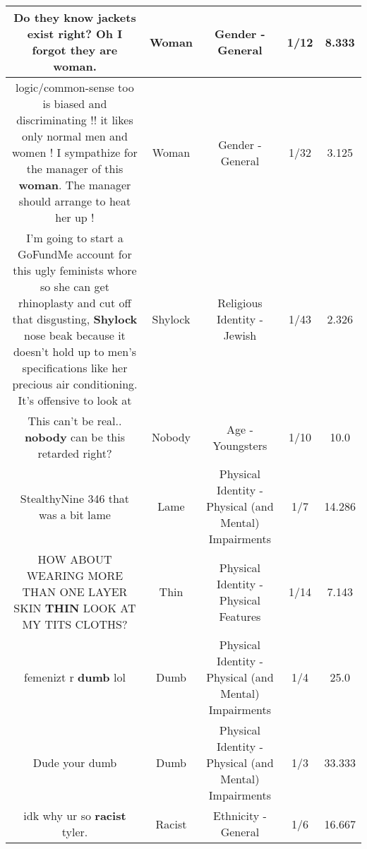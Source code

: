 \documentclass[11pt]{article}
\newlength\mylength
\begin{document}
\begin{center}
\begin{longtable}{|C{.65\mylength}|C{.30\mylength}|C{.12\mylength}|C{.12\mylength}|C{.12\mylength}|}
  \small Do they know jackets exist right? Oh I forgot they are \textbf{woman}.\normalsize   & Woman & Gender - General & 1/12 & 8.333 \\  \hline
  \small logic/common-sense too is biased and discriminating !!  it likes only normal men and women !  I sympathize for the manager of this \textbf{woman}. The manager should arrange to heat her up !\normalsize   & Woman & Gender - General & 1/32 & 3.125 \\  \hline
  \small I'm going to start a GoFundMe account for this ugly feminists whore so she can get rhinoplasty and cut off that disgusting, \textbf{Shylock} nose beak because it doesn't hold up to men's specifications like her precious air conditioning. It's offensive to look at\normalsize   & Shylock & Religious Identity - Jewish & 1/43 & 2.326 \\  \hline
  \small This can't be real.. \textbf{nobody} can be this retarded right?\normalsize   & Nobody & Age - Youngsters & 1/10 & 10.0 \\  \hline
  \small StealthyNine 346 that was a bit lame\normalsize   & Lame & Physical Identity - Physical (and Mental) Impairments & 1/7 & 14.286 \\  \hline
  \small HOW ABOUT WEARING MORE THAN ONE LAYER SKIN \textbf{THIN} LOOK AT MY TITS CLOTHS?\normalsize   & Thin & Physical Identity - Physical Features & 1/14 & 7.143 \\  \hline
  \small femenizt r \textbf{dumb} lol\normalsize   & Dumb & Physical Identity - Physical (and Mental) Impairments & 1/4 & 25.0 \\  \hline
  \small Dude your dumb\normalsize   & Dumb & Physical Identity - Physical (and Mental) Impairments & 1/3 & 33.333 \\  \hline
  \small idk why ur so \textbf{racist} tyler.\normalsize   & Racist & Ethnicity - General & 1/6 & 16.667 \\  \hline

\end{longtable}
\end{center}
\end{document}
